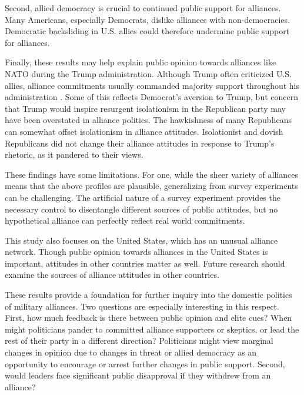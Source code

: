 \documentclass[12pt]{article}
\begin{document}
Second, allied democracy is crucial to continued public support for alliances.
Many Americans, especially Democrats, dislike alliances with non-democracies. 
Democratic backsliding in U.S. allies could therefore undermine public support for alliances. 


Finally, these results may help explain public opinion towards alliances like NATO during the Trump administration.
Although Trump often criticized U.S. allies, alliance commitments usually commanded majority support throughout his administration \citep{PewNATO2020}. 
Some of this reflects Democrat's aversion to Trump, but concern that Trump would inspire resurgent isolationism in the Republican party may have been overstated in alliance politics. 
The hawkishness of many Republicans can somewhat offset isolationism in alliance attitudes.
Isolationist and dovish Republicans did not change their alliance attitudes in response to Trump's rhetoric, as it pandered to their views. 


These findings have some limitations. 
For one, while the sheer variety of alliances means that the above profiles are plausible, generalizing from survey experiments can be challenging. 
The artificial nature of a survey experiment provides the necessary control to disentangle different sources of public attitudes, but no hypothetical alliance can perfectly reflect real world commitments.


This study also focuses on the United States, which has an unusual alliance network. 
Though public opinion towards alliances in the United States is important, attitudes in other countries matter as well. 
Future research should examine the sources of alliance attitudes in other countries. 


These results provide a foundation for further inquiry into the domestic politics of military alliances. 
Two questions are especially interesting in this respect.
First, how much feedback is there between public opinion and elite cues? 
When might politicians pander to committed alliance supporters or skeptics, or lead the rest of their party in a different direction? 
Politicians might view marginal changes in opinion due to changes in threat or allied democracy as an opportunity to encourage or arrest further changes in public support.
Second, would leaders face significant public disapproval if they withdrew from an alliance? 
\end{document}
